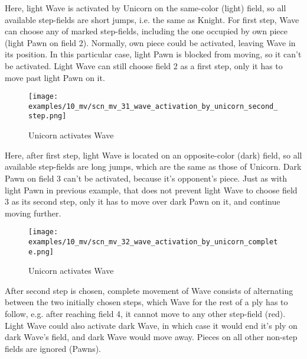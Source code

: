 Here, light Wave is activated by Unicorn on the same-color (light) field, so all available
step-fields are short jumps, i.e. the same as Knight. For first step, Wave can choose any of
marked step-fields, including the one occupied by own piece (light Pawn on field 2). Normally,
own piece could be activated, leaving Wave in its position. In this particular case, light Pawn
is blocked from moving, so it can't be activated. Light Wave can still choose field 2 as a first
step, only it has to move past light Pawn on it.

\clearpage %

\noindent
\begin{figure}[!h]
\texttt{[image: examples/10\_mv/scn\_mv\_31\_wave\_activation\_by\_unicorn\_second\_step.png]}
\caption{Unicorn activates Wave}
\label{fig:scn_mv_31_wave_activation_by_unicorn_second_step}
\end{figure}

Here, after first step, light Wave is located on an opposite-color (dark) field, so all available
step-fields are long jumps, which are the same as those of Unicorn. Dark Pawn on field 3 can't be
activated, because it's opponent's piece. Just as with light Pawn in previous example, that does
not prevent light Wave to choose field 3 as its second step, only it has to move over dark Pawn
on it, and continue moving further.

\clearpage %

\noindent
\begin{figure}[!h]
\texttt{[image: examples/10\_mv/scn\_mv\_32\_wave\_activation\_by\_unicorn\_complete.png]}
\caption{Unicorn activates Wave}
\label{fig:scn_mv_32_wave_activation_by_unicorn_complete}
\end{figure}

After second step is chosen, complete movement of Wave consists of alternating between the two initially
chosen steps, which Wave for the rest of a ply has to follow, e.g. after reaching field 4, it cannot move
to any other step-field (red). Light Wave could also activate dark Wave, in which case it would end it's
ply on dark Wave's field, and dark Wave would move away. Pieces on all other non-step fields are ignored
(Pawns).


